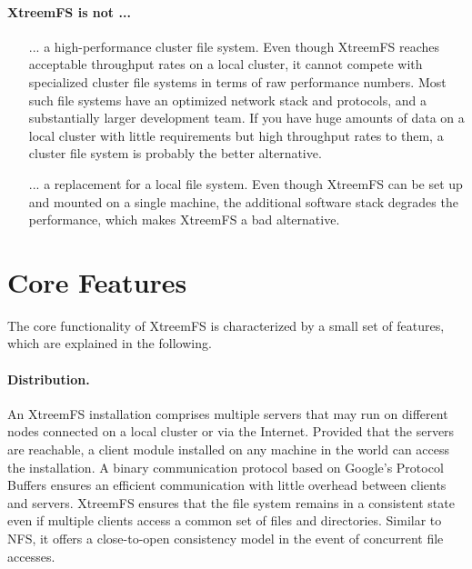 \documentclass[a4paper,10pt]{book}
\begin{document}
\paragraph{XtreemFS is not ...}
\begin{itemize}
 \item [...] a high-performance cluster file system. Even though XtreemFS reaches acceptable throughput rates on a local cluster, it cannot compete with specialized cluster file systems in terms of raw performance numbers. Most such file systems have an optimized network stack and protocols, and a substantially larger development team. If you have huge amounts of data on a local cluster with little requirements but high throughput rates to them, a cluster file system is probably the better alternative.
 \item [...] a replacement for a local file system. Even though XtreemFS can be set up and mounted on a single machine, the additional software stack degrades the performance, which makes XtreemFS a bad alternative.
\end{itemize}

\section{Core Features}
The core functionality of XtreemFS is characterized by a small set of features, which are explained in the following.

\paragraph{Distribution.}
An XtreemFS installation comprises multiple servers that may run on different nodes connected on a local cluster or via the Internet. Provided that the servers are reachable, a client module installed on any machine in the world can access the installation. A binary communication protocol based on Google's Protocol Buffers ensures an efficient communication with little overhead between clients and servers. XtreemFS ensures that the file system remains in a consistent state even if multiple clients access a common set of files and directories. Similar to NFS, it offers a close-to-open consistency model in the event of concurrent file accesses.
\end{document}
